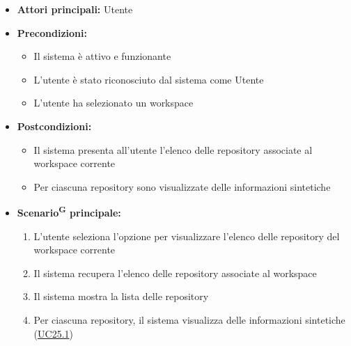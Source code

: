 \documentclass[a4paper, 11pt]{article}
\begin{document}
\begin{itemize}
	\item \textbf{Attori principali:} Utente
	\item \textbf{Precondizioni:} 
	\begin{itemize}
		\item Il sistema è attivo e funzionante
		\item L'utente è stato riconosciuto dal sistema come Utente
		\item L'utente ha selezionato un workspace
	\end{itemize}
	\item \textbf{Postcondizioni:} 
	\begin{itemize}
		\item Il sistema presenta all'utente l'elenco delle repository associate al workspace corrente
		\item Per ciascuna repository sono visualizzate delle informazioni sintetiche
	\end{itemize}
	\item \textbf{Scenario\textsuperscript{G} principale:}
	\begin{enumerate}
		\item L'utente seleziona l'opzione per visualizzare l'elenco delle repository del workspace corrente
		\item Il sistema recupera l'elenco delle repository associate al workspace 
		\item Il sistema mostra la lista delle repository
		\item Per ciascuna repository, il sistema visualizza delle informazioni sintetiche (\hyperref[UC25.1]{UC25.1})
	\end{enumerate}
	

\end{itemize}
\end{document}
